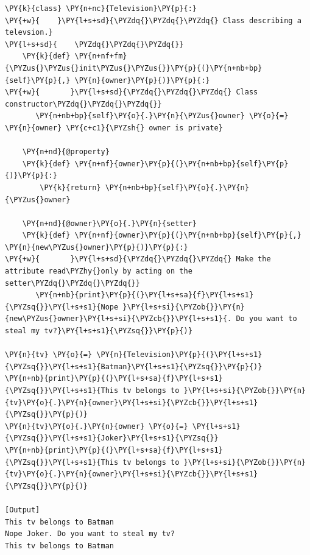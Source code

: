 \begin{Verbatim}[label=\makebox{\url{https://github.com/lucabaldini/cmepda/tree/master/slides/latex/snippets/class\_tv\_encapsulation\_properties.py}},commandchars=\\\{\}]
\PY{k}{class} \PY{n+nc}{Television}\PY{p}{:}
\PY{+w}{    }\PY{l+s+sd}{\PYZdq{}\PYZdq{}\PYZdq{} Class describing a televsion.}
\PY{l+s+sd}{    \PYZdq{}\PYZdq{}\PYZdq{}}
    \PY{k}{def} \PY{n+nf+fm}{\PYZus{}\PYZus{}init\PYZus{}\PYZus{}}\PY{p}{(}\PY{n+nb+bp}{self}\PY{p}{,} \PY{n}{owner}\PY{p}{)}\PY{p}{:}
\PY{+w}{       }\PY{l+s+sd}{\PYZdq{}\PYZdq{}\PYZdq{} Class constructor\PYZdq{}\PYZdq{}\PYZdq{}}
       \PY{n+nb+bp}{self}\PY{o}{.}\PY{n}{\PYZus{}owner} \PY{o}{=} \PY{n}{owner} \PY{c+c1}{\PYZsh{} owner is private}

    \PY{n+nd}{@property}
    \PY{k}{def} \PY{n+nf}{owner}\PY{p}{(}\PY{n+nb+bp}{self}\PY{p}{)}\PY{p}{:}
        \PY{k}{return} \PY{n+nb+bp}{self}\PY{o}{.}\PY{n}{\PYZus{}owner}

    \PY{n+nd}{@owner}\PY{o}{.}\PY{n}{setter}
    \PY{k}{def} \PY{n+nf}{owner}\PY{p}{(}\PY{n+nb+bp}{self}\PY{p}{,} \PY{n}{new\PYZus{}owner}\PY{p}{)}\PY{p}{:}
\PY{+w}{       }\PY{l+s+sd}{\PYZdq{}\PYZdq{}\PYZdq{} Make the attribute read\PYZhy{}only by acting on the setter\PYZdq{}\PYZdq{}\PYZdq{}}
       \PY{n+nb}{print}\PY{p}{(}\PY{l+s+sa}{f}\PY{l+s+s1}{\PYZsq{}}\PY{l+s+s1}{Nope }\PY{l+s+si}{\PYZob{}}\PY{n}{new\PYZus{}owner}\PY{l+s+si}{\PYZcb{}}\PY{l+s+s1}{. Do you want to steal my tv?}\PY{l+s+s1}{\PYZsq{}}\PY{p}{)}

\PY{n}{tv} \PY{o}{=} \PY{n}{Television}\PY{p}{(}\PY{l+s+s1}{\PYZsq{}}\PY{l+s+s1}{Batman}\PY{l+s+s1}{\PYZsq{}}\PY{p}{)}
\PY{n+nb}{print}\PY{p}{(}\PY{l+s+sa}{f}\PY{l+s+s1}{\PYZsq{}}\PY{l+s+s1}{This tv belongs to }\PY{l+s+si}{\PYZob{}}\PY{n}{tv}\PY{o}{.}\PY{n}{owner}\PY{l+s+si}{\PYZcb{}}\PY{l+s+s1}{\PYZsq{}}\PY{p}{)}
\PY{n}{tv}\PY{o}{.}\PY{n}{owner} \PY{o}{=} \PY{l+s+s1}{\PYZsq{}}\PY{l+s+s1}{Joker}\PY{l+s+s1}{\PYZsq{}}
\PY{n+nb}{print}\PY{p}{(}\PY{l+s+sa}{f}\PY{l+s+s1}{\PYZsq{}}\PY{l+s+s1}{This tv belongs to }\PY{l+s+si}{\PYZob{}}\PY{n}{tv}\PY{o}{.}\PY{n}{owner}\PY{l+s+si}{\PYZcb{}}\PY{l+s+s1}{\PYZsq{}}\PY{p}{)}

[Output]
This tv belongs to Batman
Nope Joker. Do you want to steal my tv?
This tv belongs to Batman
\end{Verbatim}